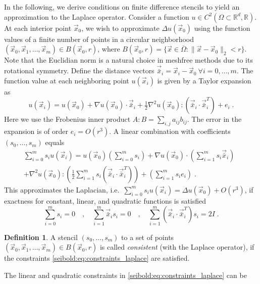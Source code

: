 \documentclass[reqno]{amsart}
\theoremstyle{plain}
\theoremstyle{definition}
\newtheorem{defn}{Definition}
\theoremstyle{remark}
\begin{document}
In the following, we derive conditions on finite difference stencils to yield an
approximation to the Laplace operator.
Consider a function $u\in C^2(\Omega\subset\mathbb{R}^d,\mathbb{R})$. At each interior
point $\vec{x}_0$, we wish to approximate $\Delta u(\vec{x}_0)$ using the function
values of a finite number of points in a circular neighborhood
$(\vec{x}_0,\vec{x}_1,\dots,\vec{x}_m)\in B(\vec{x}_0,r)$, where
$B(\vec{x}_0,r) = \{\vec{x}\in\overline{\Omega}:\|\vec{x}-\vec{x}_0\|_2<r\}$.
Note that the Euclidian norm is a natural choice in meshfree methods due to its
rotational symmetry. Define the distance vectors
$\vec{\bar x}_i = \vec{x}_i-\vec{x}_0 \ \forall i=0,\dots,m$.
The function value at each neighboring point $u(\vec{x}_i)$ is given by a Taylor
expansion as
\begin{equation*}
u(\vec{x}_i) = u(\vec{x}_0)+\nabla u(\vec{x}_0)\cdot\vec{\bar x}_i
+\tfrac{1}{2}\nabla^2 u(\vec{x}_0):{\left({\vec{\bar x}_i\cdot\vec{\bar x}_i^T}\right)}+e_i\;.
\end{equation*}
Here we use the Frobenius inner product $A:B=\sum_{i,j}a_{ij}b_{ij}$. The error in
the expansion is of order $e_i = O(r^3)$. A linear combination with coefficients
$(s_0,\dots,s_m)$ equals
\begin{align*}
\sum_{i=0}^m s_i u(\vec{x}_i) =
u(\vec{x}_0){\left({\sum_{i=0}^m s_i}\right)}
+\nabla u(\vec{x}_0)\cdot{\left({\sum_{i=1}^m s_i\vec{\bar x}_i}\right)}\;\; \\
+\nabla^2 u(\vec{x}_0):{\left({\frac{1}{2}\sum_{i=1}^m
s_i{\left({\vec{\bar x}_i\cdot\vec{\bar x}_i^T}\right)}}\right)}
+{\left({\sum_{i=1}^m s_ie_i}\right)}\;.
\end{align*}
This approximates the Laplacian,
i.e.~$\sum_{i=0}^m s_i u(\vec{x}_i) = \Delta u(\vec{x}_0)+O(r^3)$,
if exactness for constant, linear, and quadratic functions is satisfied
\begin{equation}
\sum_{i=0}^m s_i = 0 \quad , \quad
\sum_{i=1}^m\vec{\bar x}_i s_i = 0 \quad , \quad
\sum_{i=1}^m{\left({\vec{\bar x}_i\cdot\vec{\bar x}_i^T}\right)}s_i = 2I\;.
\label{seibold:eq:constraints_laplace}
\end{equation}
\begin{defn}
\label{seibold:def:consistency}
A stencil $(s_0,\dots,s_m)$ to a set of points
$(\vec{x}_0,\vec{x}_1,\dots,\vec{x}_m)\in B(\vec{x}_0,r)$ is called \emph{consistent}
(with the Laplace operator), if the constraints \eqref{seibold:eq:constraints_laplace}
are satisfied.
\end{defn}
The linear and quadratic constraints in \eqref{seibold:eq:constraints_laplace} can be
\end{document}
